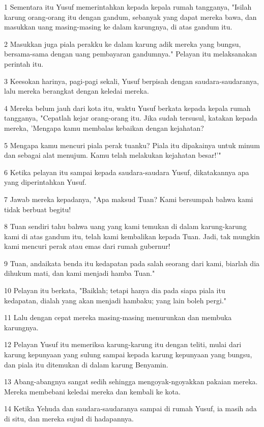 \par 1 Sementara itu Yusuf memerintahkan kepada kepala rumah tangganya, "Isilah karung orang-orang itu dengan gandum, sebanyak yang dapat mereka bawa, dan masukkan uang masing-masing ke dalam karungnya, di atas gandum itu.
\par 2 Masukkan juga piala perakku ke dalam karung adik mereka yang bungsu, bersama-sama dengan uang pembayaran gandumnya." Pelayan itu melaksanakan perintah itu.
\par 3 Keesokan harinya, pagi-pagi sekali, Yusuf berpisah dengan saudara-saudaranya, lalu mereka berangkat dengan keledai mereka.
\par 4 Mereka belum jauh dari kota itu, waktu Yusuf berkata kepada kepala rumah tangganya, "Cepatlah kejar orang-orang itu. Jika sudah tersusul, katakan kepada mereka, 'Mengapa kamu membalas kebaikan dengan kejahatan?
\par 5 Mengapa kamu mencuri piala perak tuanku? Piala itu dipakainya untuk minum dan sebagai alat menujum. Kamu telah melakukan kejahatan besar!'"
\par 6 Ketika pelayan itu sampai kepada saudara-saudara Yusuf, dikatakannya apa yang diperintahkan Yusuf.
\par 7 Jawab mereka kepadanya, "Apa maksud Tuan? Kami bersumpah bahwa kami tidak berbuat begitu!
\par 8 Tuan sendiri tahu bahwa uang yang kami temukan di dalam karung-karung kami di atas gandum itu, telah kami kembalikan kepada Tuan. Jadi, tak mungkin kami mencuri perak atau emas dari rumah gubernur!
\par 9 Tuan, andaikata benda itu kedapatan pada salah seorang dari kami, biarlah dia dihukum mati, dan kami menjadi hamba Tuan."
\par 10 Pelayan itu berkata, "Baiklah; tetapi hanya dia pada siapa piala itu kedapatan, dialah yang akan menjadi hambaku; yang lain boleh pergi."
\par 11 Lalu dengan cepat mereka masing-masing menurunkan dan membuka karungnya.
\par 12 Pelayan Yusuf itu memeriksa karung-karung itu dengan teliti, mulai dari karung kepunyaan yang sulung sampai kepada karung kepunyaan yang bungsu, dan piala itu ditemukan di dalam karung Benyamin.
\par 13 Abang-abangnya sangat sedih sehingga mengoyak-ngoyakkan pakaian mereka. Mereka membebani keledai mereka dan kembali ke kota.
\par 14 Ketika Yehuda dan saudara-saudaranya sampai di rumah Yusuf, ia masih ada di situ, dan mereka sujud di hadapannya.
